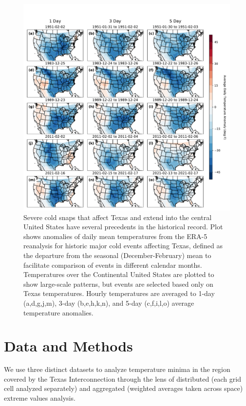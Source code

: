\documentclass[12pt]{iopart}
\begin{document}
\begin{figure}
  \centering
  \includegraphics[width=\textwidth]{historic_events_era5.pdf}
  \caption{
    Severe cold snaps that affect Texas and extend into the central United States have several precedents in the historical record.
    Plot shows anomalies of daily mean temperatures from the ERA-5 reanalysis \cite{hersbach_era5:2020} for historic major cold events affecting Texas, defined as the departure from the seasonal (December-February) mean to facilitate comparison of events in different calendar months.
    Temperatures over the Continental United States are plotted to show large-scale patterns, but events are selected based only on Texas temperatures.
    Hourly temperatures are averaged to 1-day (a,d,g,j,m), 3-day (b,e,h,k,n), and 5-day (c,f,i,l,o) average temperature anomalies.
  }\label{fig:historic_era5}
\end{figure}

\section{Data and Methods}

We use three distinct datasets to analyze temperature minima in the region covered by the Texas Interconnection through the lens of distributed (each grid cell analyzed separately) and aggregated (weighted averages taken across space) extreme values analysis.
\end{document}
